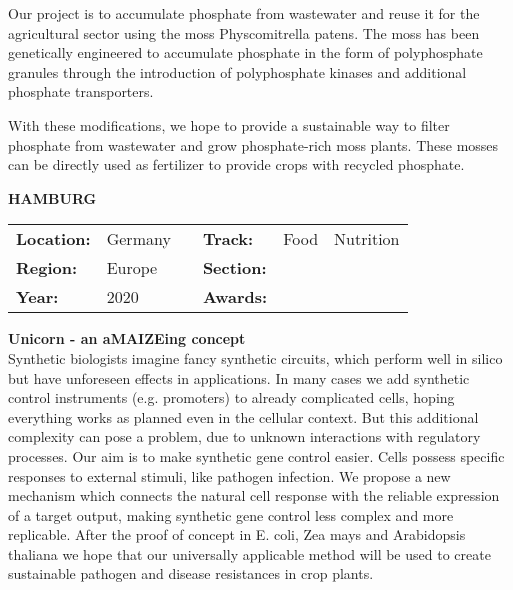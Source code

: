 Our project is to accumulate phosphate from wastewater and reuse it for the agricultural sector using the moss Physcomitrella patens. The moss has been genetically engineered to accumulate phosphate in the form of polyphosphate granules through the introduction of polyphosphate kinases and additional phosphate transporters.

With these modifications, we hope to provide a sustainable way to filter phosphate from wastewater and grow phosphate-rich moss plants. These mosses can be directly used as fertilizer to provide crops with recycled phosphate.
\vspace{2cm}

\textbf{\uppercase{Hamburg}}
\FloatBarrier
\begin{table}[h]
\begin{tabular}{lp{2.5cm}llll}
\textbf{Location:} & Germany & \multicolumn{1}{|l}{} & \textbf{Track:}   & Food & Nutrition \\
\textbf{Region:}   & Europe   & \multicolumn{1}{|l}{} & \textbf{Section:} &  \\
\textbf{Year:}     & 2020   & \multicolumn{1}{|l}{} & \textbf{Awards:}  &
\end{tabular}
\end{table}
\FloatBarrier
\noindent	\textbf{Unicorn - an aMAIZEing concept} \vspace{.2cm}\\
Synthetic biologists imagine fancy synthetic circuits, which perform well in silico but have unforeseen effects in applications. In many cases we add synthetic control instruments (e.g. promoters) to already complicated cells, hoping everything works as planned even in the cellular context. But this additional complexity can pose a problem, due to unknown interactions with regulatory processes. Our aim is to make synthetic gene control easier. Cells possess specific responses to external stimuli, like pathogen infection. We propose a new mechanism which connects the natural cell response with the reliable expression of a target output, making synthetic gene control less complex and more replicable. After the proof of concept in E. coli, Zea mays and Arabidopsis thaliana we hope that our universally applicable method will be used to create sustainable pathogen and disease resistances in crop plants. 
\vspace{2cm} $ $
\pagebreak

